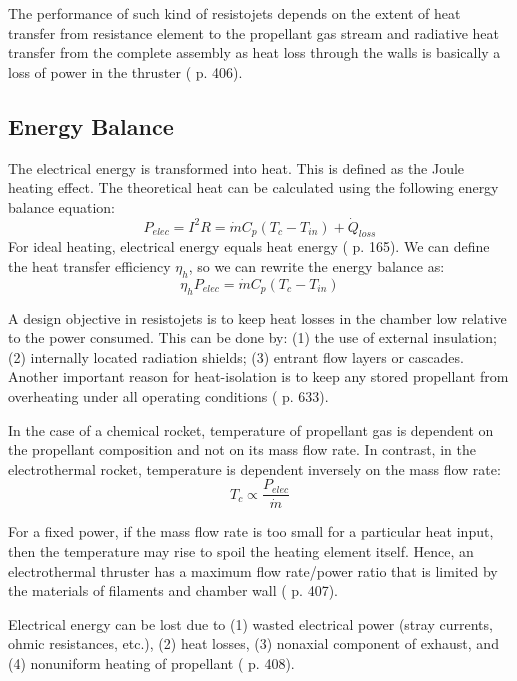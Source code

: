 The performance of such kind of resistojets depends on the extent of heat transfer from resistance element to the propellant gas stream and radiative heat transfer from the complete assembly as heat loss through the walls is basically a loss of power in the thruster (\cite{fund_rocket_prop} p. 406).

\subsection{Energy Balance}
The electrical energy is transformed into heat. This is defined as the Joule heating effect. The theoretical heat can be calculated using the following energy balance equation:
\begin{equation}
    P_{elec} = I^2 R = \dot{m} C_p (T_c - T_{in}) + \dot{Q}_{loss}
\end{equation}
For ideal heating, electrical energy equals heat energy (\cite{resjet} p. 165). We can define the heat transfer efficiency $\eta_h$, so we can rewrite the energy balance as:
\begin{equation}
    \eta_h P_{elec} = \dot{m} C_p (T_c - T_{in})
\end{equation}

A design objective in resistojets is to keep heat losses in the chamber low relative to the power consumed. This can be done by: (1) the use of external insulation; (2) internally located radiation shields; (3) entrant flow layers or cascades.
Another important reason for heat-isolation is to keep any stored propellant from overheating under all operating conditions (\cite{Sutton2016-RPE9th} p. 633).

In the case of a chemical rocket, temperature of propellant gas is dependent on the propellant composition and not on its mass flow rate. In contrast, in the electrothermal rocket, temperature is dependent inversely on the mass flow rate:
\begin{equation}
    T_c \propto \frac{P_{elec}}{\dot{m}}
\end{equation}

For a fixed power, if the mass flow rate is too small for a particular heat input, then the temperature may rise to spoil the heating element itself. Hence, an electrothermal thruster has a maximum flow rate/power ratio that is limited by the materials of filaments and chamber wall (\cite{fund_rocket_prop} p. 407).

Electrical energy can be lost due to (1) wasted electrical power (stray currents, ohmic resistances, etc.), (2) heat losses, (3) nonaxial component of exhaust, and (4) nonuniform heating of propellant (\cite{fund_rocket_prop} p. 408). 

